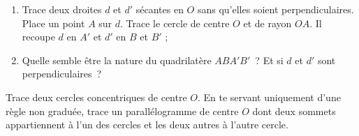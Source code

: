 \vspace{1em}

\begin{exercice}
 \begin{enumerate}
  \item Trace deux droites $d$ et $d'$ sécantes en $O$ sans qu'elles soient perpendiculaires. Place un point $A$ sur $d$. Trace le cercle de centre $O$ et de rayon $OA$. Il recoupe $d$ en $A'$ et $d'$ en $B$ et $B'$ ;
  \item Quelle semble être la nature du quadrilatère $ABA'B'$ ? Et si $d$ et $d'$ sont perpendiculaires ?
  \end{enumerate}
\end{exercice}


\begin{exercice}
\vspace{1em}
Trace deux cercles concentriques de centre $O$. En te servant uniquement d'une règle non graduée, trace un parallélogramme de centre $O$ dont deux sommets appartiennent à l'un des cercles et les deux autres à l'autre cercle.
\end{exercice}


